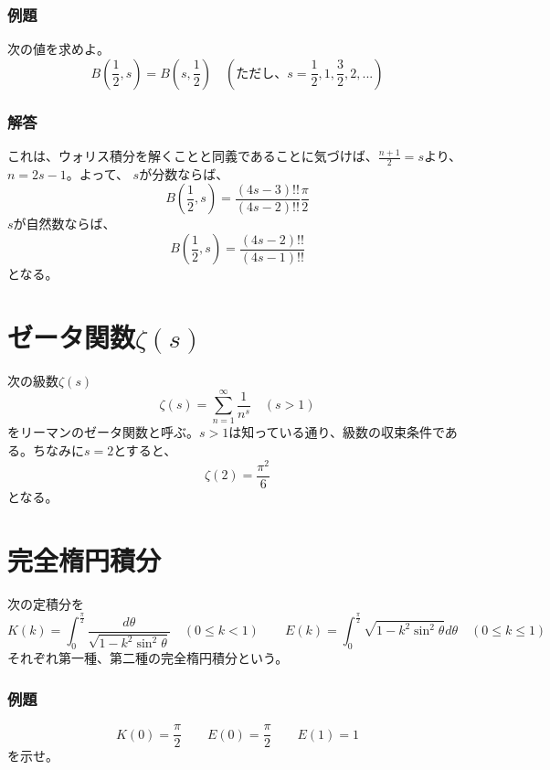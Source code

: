 \documentclass[a4j,dvipdfmx]{jsarticle}
\begin{document}
\subsubsection*{例題}
次の値を求めよ。
\begin{equation*}
    B\left(\frac{1}{2},s\right)=B\left(s,\frac{1}{2}\right)\quad(\text{ただし、}s=\frac{1}{2},1,\frac{3}{2},2,...)
\end{equation*}
\subsubsection*{解答}
これは、ウォリス積分を解くことと同義であることに気づけば、$\frac{n+1}{2}=s$より、$n=2s-1$。よって、
$s$が分数ならば、
\begin{equation*}
    B\left(\frac{1}{2},s\right)=\frac{(4s-3)!!}{(4s-2)!!}\frac{\pi}{2}
\end{equation*}
$s$が自然数ならば、
\begin{equation*}
    B\left(\frac{1}{2},s\right)=\frac{(4s-2)!!}{(4s-1)!!}
\end{equation*}
となる。
\section{ゼータ関数$\zeta(s)$}
次の級数$\zeta(s)$
\begin{equation*}
    \zeta(s)=\sum_{n=1}^\infty \frac{1}{n^s}\quad(s>1)
\end{equation*}
をリーマンのゼータ関数と呼ぶ。$s>1$は知っている通り、級数の収束条件である。ちなみに$s=2$とすると、
\begin{equation*}
    \zeta(2)=\frac{\pi^2}{6}
\end{equation*}
となる。
\section{完全楕円積分}
次の定積分を
\begin{equation*}
    K(k)=\int_0^\frac{\pi}{2}\frac{d\theta}{\sqrt{1-k^2\sin^2\theta}}\quad(0\leq k<1)\qquad E(k)=\int_0^\frac{\pi}{2}\sqrt{1-k^2\sin^2\theta}d\theta\quad(0\leq k\leq 1)
\end{equation*}
それぞれ第一種、第二種の完全楕円積分という。
\subsubsection*{例題}
\begin{equation*}
    K(0)=\frac{\pi}{2}\qquad E(0)=\frac{\pi}{2}\qquad E(1)=1
\end{equation*}
を示せ。
\end{document}
